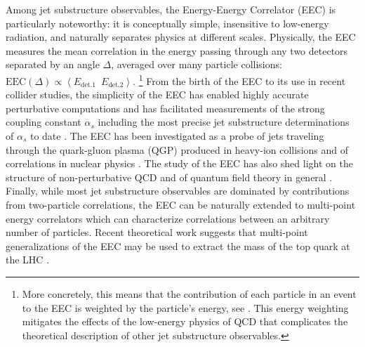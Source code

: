 Among jet substructure observables, the Energy-Energy Correlator (EEC) \cite{Basham:1978bw,Basham:1978zq,Basham:1979gh} is particularly noteworthy:
%
it is conceptually simple, insensitive to low-energy radiation, and naturally separates physics at different scales.
%
Physically, the EEC measures the mean correlation in the energy passing through any two detectors separated by an angle \(\Delta\), averaged over many particle collisions:
%
\(
    \text{EEC}(\Delta)
    \propto
    \left\langle
        E_\text{det.\.1} \,\,\, E_\text{det.\.2}
    \right\rangle
\).%
\footnote{
    More concretely, this means that the contribution of each particle in an event to the EEC is weighted by the particle's energy,
    see .
    This energy weighting mitigates the effects of the low-energy physics of QCD that complicates the theoretical description of other jet substructure observables.
}
%
From the birth of the EEC to its use in recent collider studies, the simplicity of the EEC has enabled highly accurate perturbative computations \cite{Clay:1995sd,Glover:1994vz,Kramer:1996qr,DelDuca:2016csb,Gituliar:2017umx,Dixon:2018tpg,Dixon:2018qgp,Henn:2019gkr,Luo:2019nig,Gao:2020vyx,Neill:2022lqx,Lee:2023npz,Kramer:1995qh,deFlorian:2004mp,Banfi:2002vw,Tulipant:2017ybb,Moult:2018jzp,Korchemsky:2019nzm,Dixon:2019uzg,Gao:2019ojf,Luo:2019hmp,Luo:2019bmw,Moult:2019vou,Li:2020bub,Ebert:2020sfi,Li:2021txc,Duhr:2022yyp,Chen:2023zlx,Gao:2023ivm} and has facilitated measurements of the strong coupling constant \(\alpha_s\) \cite{Martin:1986uq,DELPHI:1990sof,SLD:1994yoe,ATLAS:2015yaa,ATLAS:2017qir,dEnterria:2018cye,Kardos:2018kqj,Ali:2020ksn,dEnterria:2022hzv,ATLAS:2023tgo} including the most precise jet substructure determinations of \(\alpha_s\) to date \cite{CMS:2024mlf}.
%
The EEC has been investigated as a probe of jets traveling through the quark-gluon plasma (QGP) produced in heavy-ion collisions \cite{Lokhtin:2004tx,Lokhtin:2006dp,Andres:2022ovj,Barata:2023zqg,Andres:2023xwr,Yang:2023dwc,Barata:2023vnl,Barata:2023bhh,Barata:2024nqo} and of correlations in nuclear physics \cite{Karapetyan:2019fst,Liu:2022wop,Liu:2023aqb,Kang:2023gvg,Cao:2023oef}.
%
The study of the EEC has also shed light on the structure of non-perturbative QCD \cite{Nason:1995np,Korchemsky:1997sy,Korchemsky:1999kt,Dokshitzer:1999sh,Chen:2020vvp,Jaarsma:2023ell,Schindler:2023cww,Lee:2024esz}
and of quantum field theory in general \cite{Richards:1983sr,Sveshnikov:1995vi,Hofman:2008ar,Hatta:2012kn,Belitsky:2013bja,Belitsky:2013ofa,Belitsky:2013xxa,Belitsky:2014zha,Korchemsky:2015ssa,Goncalves:2014ffa,Farnsworth:2015hum,Hofman:2016awc,Kravchuk:2018htv,Kologlu:2019mfz,Chang:2020qpj,Korchemsky:2021htm,Caron-Huot:2022eqs,Chen:2023wah,Chicherin:2023gxt,Chicherin:2024ifn}.
%
Finally, while most jet substructure observables are dominated by contributions from two-particle correlations, the EEC can be naturally extended to multi-point energy correlators which can characterize correlations between an arbitrary number of particles.
%
Recent theoretical work suggests that multi-point generalizations of the EEC may be used to extract the mass of the top quark at the LHC \cite{Procura:2022fid,Holguin:2022epo,Holguin:2023bjf,Pathak:2023tmy,Xiao:2024rol,Holguin:2024tkz}.

